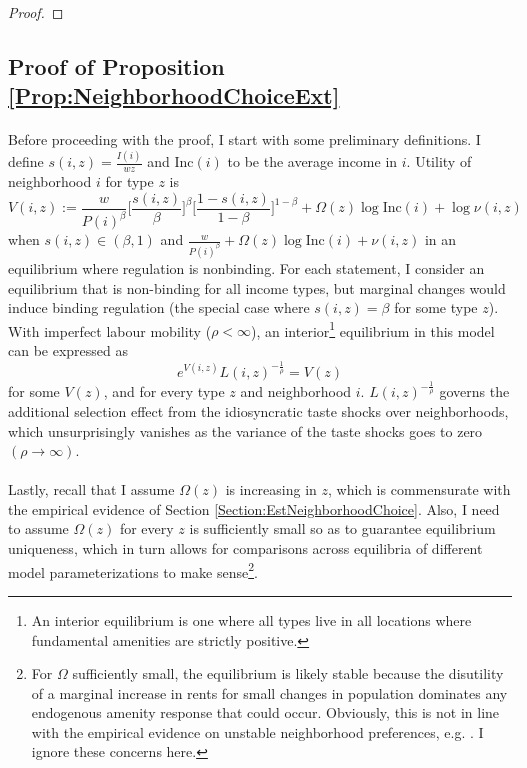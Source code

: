 \documentclass[12pt]{article}
\begin{document}
\begin{enumerate}
\begin{proof}
		\end{proof}
		
	\end{enumerate}
	
	\clearpage
	\subsection{Proof of Proposition \ref{Prop:NeighborhoodChoiceExt}}\label{Proof:NeighborhoodChoiceExt}
	
	\paragraph*{}
	Before proceeding with the proof, I start with some preliminary definitions. I define $s(i, z) = \frac{I(i)}{wz}$ and $\text{Inc}(i)$ to be the average income in $i$. Utility of neighborhood $i$ for type $z$ is $$V(i, z) := \frac{w}{P(i)^{\beta}}\bigg[\frac{s(i, z)}{\beta}\bigg]^{\beta}\bigg[\frac{1 - s(i, z)}{1 - \beta}\bigg]^{1 - \beta} + \Omega(z)\log \text{Inc}(i) + \log \nu(i, z)$$ when $s(i, z) \in (\beta, 1)$ and $\frac{w}{P(i)^{\beta}} + \Omega(z)\log \text{Inc}(i) + \nu(i, z)$ in an equilibrium where regulation is nonbinding. For each statement, I consider an equilibrium that is non-binding for all income types, but marginal changes would induce binding regulation (the special case where $s(i, z) = \beta$ for some type $z$). With imperfect labour mobility ($\rho < \infty$), an interior\footnote{An interior equilibrium is one where all types live in all locations where fundamental amenities are strictly positive. } equilibrium in this model can be expressed as 
	\begin{equation}\label{AppendixEq:EquilibriumPropNCE}
		e^{V(i, z)}L(i, z)^{-\frac{1}{\rho}} = V(z)
	\end{equation}
	for some $V(z)$, and for every type $z$ and neighborhood $i$. $L(i, z)^{-\frac{1}{\rho}}$ governs the additional selection effect from the idiosyncratic taste shocks over neighborhoods, which unsurprisingly vanishes as the variance of the taste shocks goes to zero $(\rho \to \infty)$. 
	
	\paragraph*{}
	Lastly, recall that I assume $\Omega(z)$ is increasing in $z$, which is commensurate with the empirical evidence of Section \ref{Section:EstNeighborhoodChoice}. Also, I need to assume $\Omega(z)$ for every $z$ is sufficiently small so as to guarantee equilibrium uniqueness, which in turn allows for comparisons across equilibria of different model parameterizations to make sense\footnote{For $\Omega$ sufficiently small, the equilibrium is likely stable because the disutility of a marginal increase in rents for small changes in population dominates any endogenous amenity response that could occur. Obviously, this is not in line with the empirical evidence on unstable neighborhood preferences, e.g. \citep{davisetalracepref}. I ignore these concerns here.}.
	
\end{document}
